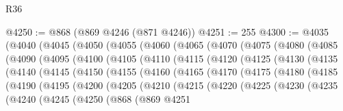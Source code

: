 \begin{lexlean}{R36}
\begin{coremodule}
@4250 := @868 (@869 @4246 (@871 @4246))
@4251 := 255
@4300 := @4035
    (@4040
      (@4045
        (@4050
          (@4055
            (@4060
              (@4065
                (@4070
                  (@4075
                    (@4080
                      (@4085
                        (@4090
                          (@4095
                            (@4100
                              (@4105
                                (@4110
                                  (@4115
                                    (@4120
                                      (@4125
                                        (@4130
                                          (@4135
                                            (@4140
                                              (@4145
                                                (@4150
                                                  (@4155
                                                    (@4160
                                                      (@4165
                                                        (@4170
                                                          (@4175
                                                            (@4180
                                                              (@4185
                                                                (@4190
                                                                  (@4195
                                                                    (@4200
                                                                      (@4205
                                                                        (@4210
                                                                          (@4215
                                                                            (@4220
                                                                              (@4225
                                                                                (@4230
                                                                                  (@4235
                                                                                    (@4240
                                                                                      (@4245
                                                                                        (@4250
                                                                                          (@868
                                                                                            (@869
                                                                                              @4251

\end{coremodule}
\end{lexlean}
